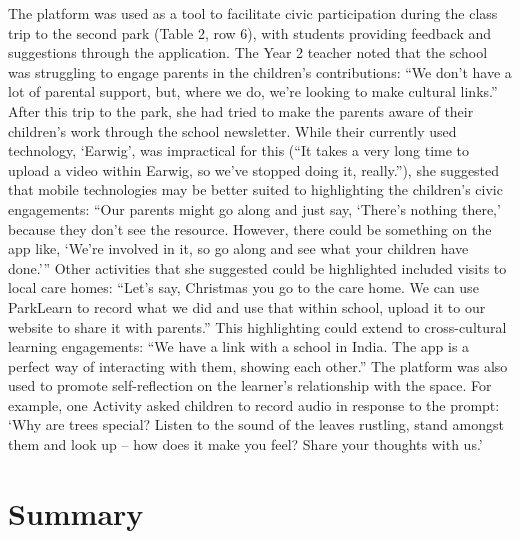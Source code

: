 The platform was used as a tool to facilitate civic participation during the class trip to the second park (Table 2, row 6), with students providing feedback and suggestions through the application. The Year 2 teacher noted that the school was struggling to engage parents in the children’s contributions: “We don’t have a lot of parental support, but, where we do, we’re looking to make cultural links.” After this trip to the park, she had tried to make the parents aware of their children’s work through the school newsletter. While their currently used technology, ‘Earwig’, was impractical for this (“It takes a very long time to upload a video within Earwig, so we’ve stopped doing it, really.”), she suggested that mobile technologies may be better suited to highlighting the children’s civic engagements: “Our parents might go along and just say, ‘There’s nothing there,’ because they don’t see the resource. However, there could be something on the app like, ‘We’re involved in it, so go along and see what your children have done.’” Other activities that she suggested could be highlighted included visits to local care homes: “Let’s say, Christmas you go to the care home. We can use ParkLearn to record what we did and use that within school, upload it to our website to share it with parents.” This highlighting could extend to cross-cultural learning engagements: “We have a link with a school in India. The app is a perfect way of interacting with them, showing each other.” The platform was also used to promote self-reflection on the learner’s relationship with the space. For example, one Activity asked children to record audio in response to the prompt: ‘Why are trees special? Listen to the sound of the leaves rustling, stand amongst them and look up – how does it make you feel? Share your thoughts with us.’ 

\section{Summary}